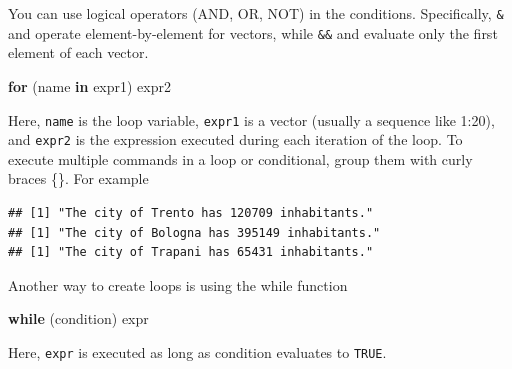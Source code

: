 \documentclass[
]{article}
\newenvironment{Shaded}{\begin{snugshade}}{\end{snugshade}}
\newcommand{\ControlFlowTok}[1]{\textcolor[rgb]{0.13,0.29,0.53}{\textbf{#1}}}
\newcommand{\DecValTok}[1]{\textcolor[rgb]{0.00,0.00,0.81}{#1}}
\newcommand{\FunctionTok}[1]{\textcolor[rgb]{0.13,0.29,0.53}{\textbf{#1}}}
\newcommand{\NormalTok}[1]{#1}
\newcommand{\SpecialCharTok}[1]{\textcolor[rgb]{0.81,0.36,0.00}{\textbf{#1}}}
\newcommand{\StringTok}[1]{\textcolor[rgb]{0.31,0.60,0.02}{#1}}
\begin{document}
You can use logical operators (AND, OR, NOT) in the conditions.
Specifically, \texttt{\&} and \texttt{\textbar{}} operate
element-by-element for vectors, while \texttt{\&\&} and
\texttt{\textbar{}\textbar{}} evaluate only the first element of each
vector.

\begin{Shaded}
\begin{Highlighting}[]
\ControlFlowTok{for}\NormalTok{ (name }\ControlFlowTok{in}\NormalTok{ expr1) expr2}
\end{Highlighting}
\end{Shaded}

Here, \texttt{name} is the loop variable, \texttt{expr1} is a vector
(usually a sequence like 1:20), and \texttt{expr2} is the expression
executed during each iteration of the loop. To execute multiple commands
in a loop or conditional, group them with curly braces \{\}. For example

\begin{Shaded}
\end{Shaded}

\begin{verbatim}
## [1] "The city of Trento has 120709 inhabitants."
## [1] "The city of Bologna has 395149 inhabitants."
## [1] "The city of Trapani has 65431 inhabitants."
\end{verbatim}

Another way to create loops is using the while function

\begin{Shaded}
\begin{Highlighting}[]
\ControlFlowTok{while}\NormalTok{ (condition) expr}
\end{Highlighting}
\end{Shaded}

Here, \texttt{expr} is executed as long as condition evaluates to
\texttt{TRUE}.
\end{document}
